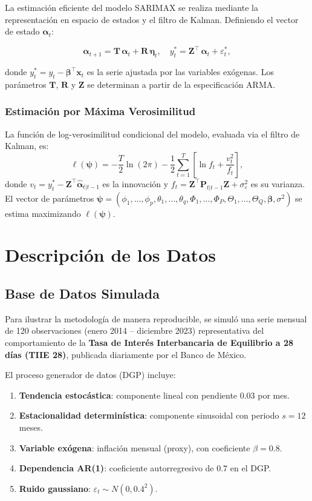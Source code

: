 \documentclass[12pt, letterpaper]{article}
\begin{document}
La estimación eficiente del modelo SARIMAX se realiza mediante la representación en espacio de estados y el filtro de Kalman. Definiendo el vector de estado $\boldsymbol{\alpha}_t$:

\[
  \boldsymbol{\alpha}_{t+1} = \mathbf{T}\,\boldsymbol{\alpha}_t + \mathbf{R}\,\boldsymbol{\eta}_t, \quad
  y_t^* = \mathbf{Z}^\top\,\boldsymbol{\alpha}_t + \varepsilon_t^*,
\]

donde $y_t^* = y_t - \boldsymbol{\beta}^\top \mathbf{x}_t$ es la serie ajustada por las variables exógenas. Los parámetros $\mathbf{T}$, $\mathbf{R}$ y $\mathbf{Z}$ se determinan a partir de la especificación ARMA.

\subsubsection{Estimación por Máxima Verosimilitud}

La función de log-verosimilitud condicional del modelo, evaluada via el filtro de Kalman, es:
\[
  \ell(\boldsymbol{\psi}) = -\frac{T}{2}\ln(2\pi) - \frac{1}{2}\sum_{t=1}^{T}\left[\ln f_t + \frac{v_t^2}{f_t}\right],
\]
donde $v_t = y_t^* - \mathbf{Z}^\top\hat{\boldsymbol{\alpha}}_{t|t-1}$ es la innovación y $f_t = \mathbf{Z}^\top \mathbf{P}_{t|t-1}\mathbf{Z} + \sigma^2_\varepsilon$ es su varianza. El vector de parámetros $\boldsymbol{\psi} = (\phi_1,\ldots,\phi_p, \theta_1,\ldots,\theta_q, \Phi_1,\ldots,\Phi_P, \Theta_1,\ldots,\Theta_Q, \boldsymbol{\beta}, \sigma^2)$ se estima maximizando $\ell(\boldsymbol{\psi})$.

\section{Descripción de los Datos}

\subsection{Base de Datos Simulada}

Para ilustrar la metodología de manera reproducible, se simuló una serie mensual de 120 observaciones (enero 2014 -- diciembre 2023) representativa del comportamiento de la \textbf{Tasa de Interés Interbancaria de Equilibrio a 28 días (TIIE 28)}, publicada diariamente por el Banco de México.

El proceso generador de datos (DGP) incluye:
\begin{enumerate}[leftmargin=2cm]
  \item \textbf{Tendencia estocástica}: componente lineal con pendiente $0.03$ por mes.
  \item \textbf{Estacionalidad determinística}: componente sinusoidal con periodo $s=12$ meses.
  \item \textbf{Variable exógena}: inflación mensual (proxy), con coeficiente $\beta = 0.8$.
  \item \textbf{Dependencia AR(1)}: coeficiente autorregresivo de $0.7$ en el DGP.
  \item \textbf{Ruido gaussiano}: $\varepsilon_t \sim N(0, 0.4^2)$.
\end{enumerate}
\end{document}
